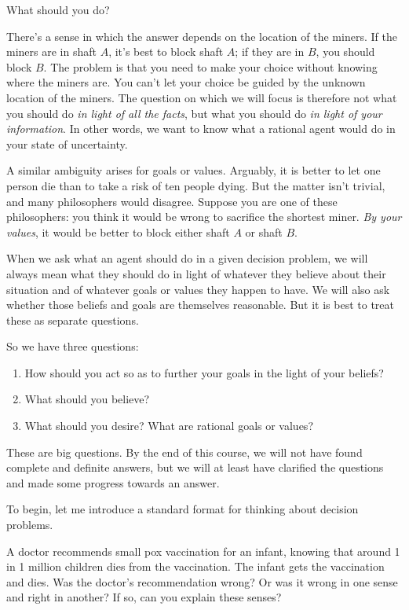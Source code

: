 What should you do?

There's a sense in which the answer depends on the location of the
miners. If the miners are in shaft $A$, it's best to block shaft $A$;
if they are in $B$, you should block $B$. The problem is that you need
to make your choice without knowing where the miners are. You can't
let your choice be guided by the unknown location of the miners. The
question on which we will focus is therefore not what you should do
\emph{in light of all the facts}, but what you should do \emph{in
  light of your information}. In other words, we want to know what a
rational agent would do in your state of uncertainty.

A similar ambiguity arises for goals or values. Arguably, it is better
to let one person die than to take a risk of ten people dying. But the
matter isn't trivial, and many philosophers would disagree. Suppose
you are one of these philosophers: you think it would be wrong to
sacrifice the shortest miner. \emph{By your values}, it would be
better to block either shaft $A$ or shaft $B$.

When we ask what an agent should do in a given decision problem, we
will always mean what they should do in light of whatever they believe
about their situation and of whatever goals or values they happen to
have. We will also ask whether those beliefs and goals are themselves
reasonable. But it is best to treat these as separate questions.

So we have three questions:
\begin{enumerate}
  \itemsep0em 
\item How should you act so as to further your goals in the light of
  your beliefs?
\item What should you believe?
\item What should you desire? What are rational goals or values?
\end{enumerate}
These are big questions. By the end of this course, we will not have
found complete and definite answers, but we will at least have
clarified the questions and made some progress towards an answer.

To begin, let me introduce a standard format for thinking about
decision problems.

\begin{exercise}
  A doctor recommends small pox vaccination for an infant, knowing
  that around 1 in 1 million children dies from the vaccination. The
  infant gets the vaccination and dies. Was the doctor's
  recommendation wrong? Or was it wrong in one sense and right in
  another? If so, can you explain these senses?
\end{exercise}


